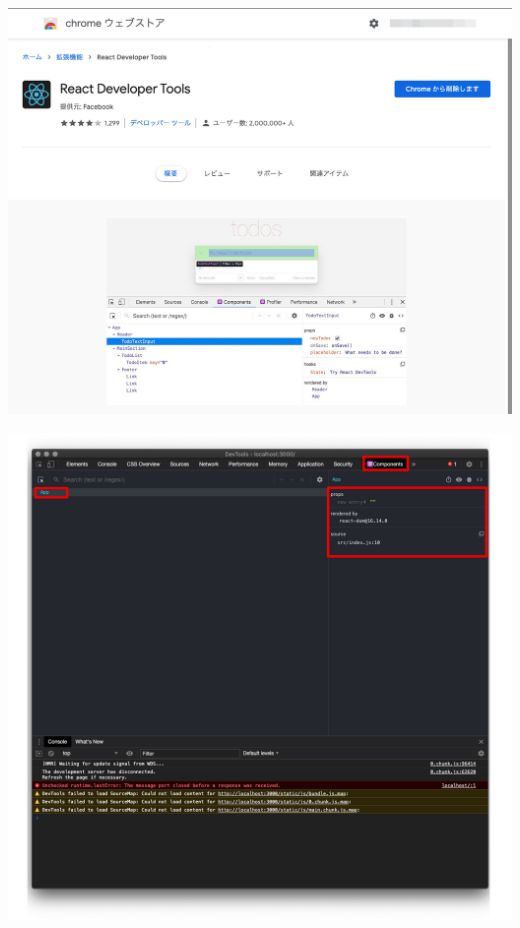 \begin{reviewimage}[H]%
\includegraphics[width=1.0\maxwidth]{./images/01-createDevEnv/01_10chromeExtReactDevTools.png}%
\label{image:01-createDevEnv:01_10chromeExtReactDevTools}
\end{reviewimage}
\begin{reviewimage}[H]%
\includegraphics[width=1.0\maxwidth]{./images/01-createDevEnv/01_12chromeExtReactDevTools01.png}%
\label{image:01-createDevEnv:01_12chromeExtReactDevTools01}
\end{reviewimage}

